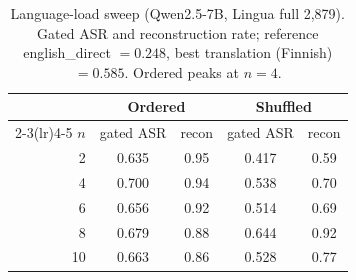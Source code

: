 \begin{table}[t]\centering
\caption{Language-load sweep (Qwen2.5-7B, Lingua full 2{,}879). Gated ASR and reconstruction rate;
reference english\_direct $=0.248$, best translation (Finnish) $=0.585$. Ordered peaks at $n{=}4$.}
\label{tab:curve}
\begin{tabular}{r cc cc}\toprule
& \multicolumn{2}{c}{Ordered} & \multicolumn{2}{c}{Shuffled}\\\cmidrule(lr){2-3}\cmidrule(lr){4-5}
$n$ & gated ASR & recon & gated ASR & recon\\\midrule
2 & 0.635 & 0.95 & 0.417 & 0.59 \\
4 & 0.700 & 0.94 & 0.538 & 0.70 \\
6 & 0.656 & 0.92 & 0.514 & 0.69 \\
8 & 0.679 & 0.88 & 0.644 & 0.92 \\
10 & 0.663 & 0.86 & 0.528 & 0.77 \\
\bottomrule\end{tabular}\end{table}
